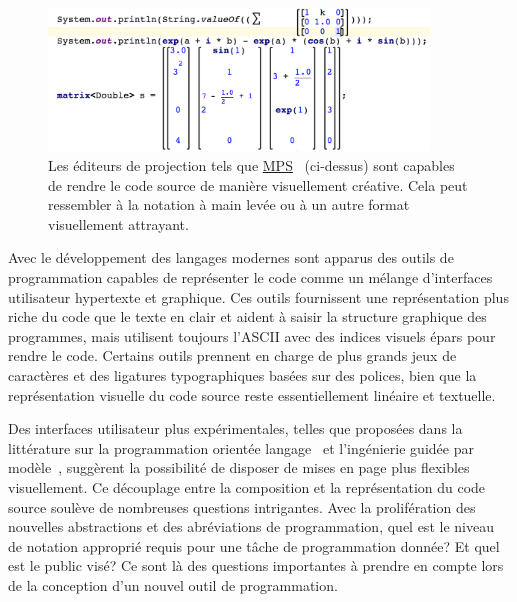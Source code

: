 \begin{figure}
\centering
\includegraphics[width=0.90\textwidth]{../figures/mps_screenshot.png}
\caption{Les éditeurs de projection tels que \href{https://www.jetbrains.com/mps/}{MPS}~\citep{voelter2010language, pech2013jetbrains} (ci-dessus) sont capables de rendre le code source de manière visuellement créative. Cela peut ressembler à la notation à main levée ou à un autre format visuellement attrayant.}
\label{fig:mps_screenshot}
\end{figure}

Avec le développement des langages modernes sont apparus des outils de programmation capables de représenter le code comme un mélange d'interfaces utilisateur hypertexte et graphique. Ces outils fournissent une représentation plus riche du code que le texte en clair et aident à saisir la structure graphique des programmes, mais utilisent toujours l'ASCII avec des indices visuels épars pour rendre le code. Certains outils prennent en charge de plus grands jeux de caractères et des ligatures typographiques basées sur des polices, bien que la représentation visuelle du code source reste essentiellement linéaire et textuelle.

Des interfaces utilisateur plus expérimentales, telles que proposées dans la littérature sur la programmation orientée langage~\citep{dmitriev2004language} et l'ingénierie guidée par modèle~\citep{famelis2015mummint}, suggèrent la possibilité de disposer de mises en page plus flexibles visuellement. Ce découplage entre la composition et la représentation du code source soulève de nombreuses questions intrigantes. Avec la prolifération des nouvelles abstractions et des abréviations de programmation, quel est le niveau de notation approprié requis pour une tâche de programmation donnée? Et quel est le public visé? Ce sont là des questions importantes à prendre en compte lors de la conception d'un nouvel outil de programmation.

